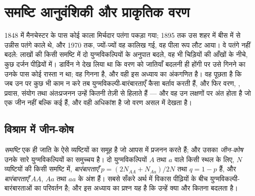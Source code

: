 \chapter{समष्टि आनुवंशिकी और प्राकृतिक वरण}\label{ch:b2:population-genetics}

1848 में मैनचेस्टर के पास कोई काला मिर्चदार पतंगा पकड़ा गया; 1895 तक
उस शहर में बीस में से उन्नीस पतंगे काले थे, और 1970 तक, ज्यों-ज्यों वह कालिख
गई, वह पीला रूप लौट आया। वे पतंगे नहीं बदले: लाखों की किसी समष्टि में
दो युग्मविकल्पियों के अनुपात बदले, वह भी चिड़ियों की आँखों के नीचे,
कुछ दर्जन पीढ़ियों में। डार्विन ने देख लिया था कि वरण को
जातियाँ बदलनी ही होंगी पर उसे गिनने का उनके पास कोई रास्ता न था;
वह गिनना  है, और वही इस अध्याय का अंकगणित है।
वह पूछता है कि जब उन पर कुछ भी काम न करे तब युग्मविकल्पी-बारंबारताएँ कैसा
बर्ताव करती हैं, और फिर वरण, , प्रवास, संयोग तथा
अंतःप्रजनन उन्हें कितनी तेज़ी से हिलाते हैं --- और वह उन लक्षणों पर अंत होता है जो
एक जीन नहीं बल्कि कई हैं, और वही अधिकांश है जो वरण असल में
देखता है।

\section{विश्राम में जीन-कोष}

\begin{definition}[समष्टि, जीन-कोष, बारंबारताएँ]\label{def:b2:population-genetics:frequencies}
\emph{समष्टि} एक ही जाति के ऐसे व्यष्टियों का समूह है जो आपस में
प्रजनन करते हैं; और उसका \emph{जीन-कोष} उनके सारे युग्मविकल्पियों का समुच्चय है।
दो युग्मविकल्पियों $A$ तथा $a$ वाले किसी स्थल के लिए, $N$ व्यष्टियों की
किसी  समष्टि में, \emph{ बारंबारताएँ} $p = (2N_{AA} +
N_{Aa})/2N$ तथा $q = 1 - p$ हैं, और \emph{ बारंबारताएँ}
$AA$, $Aa$ तथा $aa$ के अंश हैं। सबसे सँकरे अर्थ में
विकास पीढ़ियों के बीच युग्मविकल्पी-बारंबारताओं का परिवर्तन है; और इस
अध्याय का प्रश्न यह है कि उन्हें क्या और कितना बदलता है।
\end{definition}

